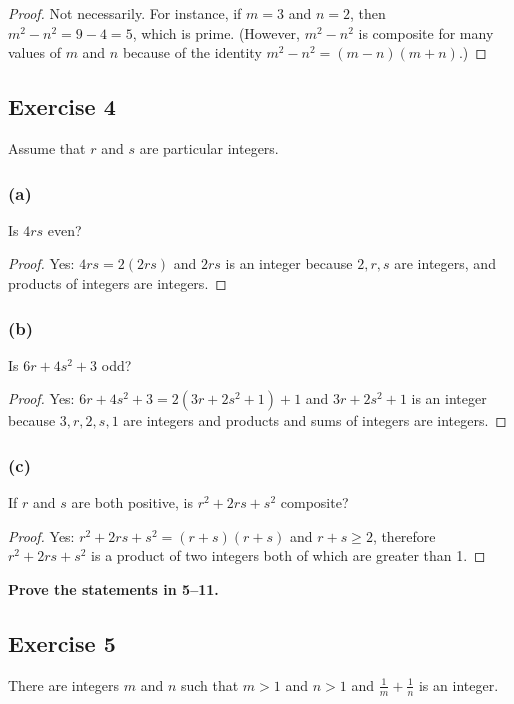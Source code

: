 \documentclass[14pt]{extarticle}
\newcommand{\cy}{\color{cyan}}
\begin{document}
\begin{proof}
Not necessarily. For instance, if $m = 3$ and $n = 2$, then $m^2 - n^2 = 9 - 4 = 5$, which is prime. (However, $m^2 - n^2$ is composite for many values of $m$ and $n$ because of the identity $m^2 - n^2 = (m - n)(m + n)$.)
\end{proof}

\subsection{Exercise 4}
Assume that $r$ and $s$ are particular integers.

\subsubsection{(a)}
Is $4rs$ even?

\begin{proof}
Yes: $4rs = 2(2rs)$ and $2rs$ is an integer because $2, r, s$ are integers, and products of integers are integers.
\end{proof}

\subsubsection{(b)}
Is $6r + 4s^2 + 3$ odd?

\begin{proof}
Yes: $6r + 4s^2 + 3 = 2(3r + 2s^2 + 1) + 1$ and $3r + 2s^2 + 1$ is an integer because $3, r, 2, s, 1$ are integers and products and sums of integers are integers.
\end{proof}

\subsubsection{(c)}
If $r$ and $s$ are both positive, is $r^2 + 2rs + s^2$ composite?

\begin{proof}
Yes: $r^2 + 2rs + s^2 = (r+s)(r+s)$ and $r + s \geq 2$, therefore $r^2 + 2rs + s^2$ is a product of two integers both of which are greater than 1.
\end{proof}

{\bf \cy Prove the statements in 5–11.}

\subsection{Exercise 5}
There are integers $m$ and $n$ such that $m > 1$ and $n > 1$ and $\frac{1}{m} + \frac{1}{n}$ is an integer.
\end{document}
